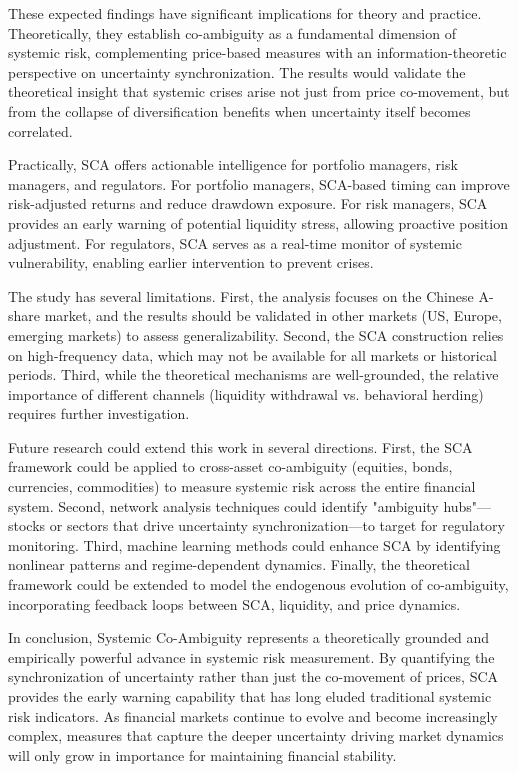 \documentclass[preprint,12pt,authoryear]{elsarticle}
\begin{document}
These expected findings have significant implications for theory and practice. Theoretically, they establish co-ambiguity as a fundamental dimension of systemic risk, complementing price-based measures with an information-theoretic perspective on uncertainty synchronization. The results would validate the theoretical insight that systemic crises arise not just from price co-movement, but from the collapse of diversification benefits when uncertainty itself becomes correlated.

Practically, SCA offers actionable intelligence for portfolio managers, risk managers, and regulators. For portfolio managers, SCA-based timing can improve risk-adjusted returns and reduce drawdown exposure. For risk managers, SCA provides an early warning of potential liquidity stress, allowing proactive position adjustment. For regulators, SCA serves as a real-time monitor of systemic vulnerability, enabling earlier intervention to prevent crises.

The study has several limitations. First, the analysis focuses on the Chinese A-share market, and the results should be validated in other markets (US, Europe, emerging markets) to assess generalizability. Second, the SCA construction relies on high-frequency data, which may not be available for all markets or historical periods. Third, while the theoretical mechanisms are well-grounded, the relative importance of different channels (liquidity withdrawal vs. behavioral herding) requires further investigation.

Future research could extend this work in several directions. First, the SCA framework could be applied to cross-asset co-ambiguity (equities, bonds, currencies, commodities) to measure systemic risk across the entire financial system. Second, network analysis techniques could identify "ambiguity hubs"—stocks or sectors that drive uncertainty synchronization—to target for regulatory monitoring. Third, machine learning methods could enhance SCA by identifying nonlinear patterns and regime-dependent dynamics. Finally, the theoretical framework could be extended to model the endogenous evolution of co-ambiguity, incorporating feedback loops between SCA, liquidity, and price dynamics.

In conclusion, Systemic Co-Ambiguity represents a theoretically grounded and empirically powerful advance in systemic risk measurement. By quantifying the synchronization of uncertainty rather than just the co-movement of prices, SCA provides the early warning capability that has long eluded traditional systemic risk indicators. As financial markets continue to evolve and become increasingly complex, measures that capture the deeper uncertainty driving market dynamics will only grow in importance for maintaining financial stability.



\end{document}
